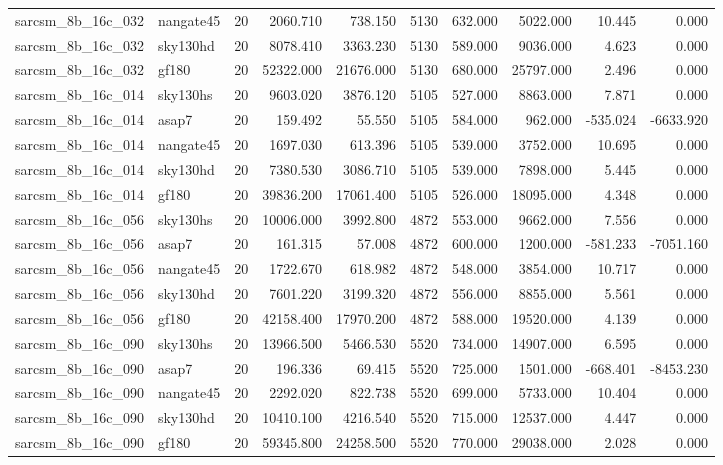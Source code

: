 \documentclass{article}
\begin{document}
\begin{longtable}{llrrrrrrrr}
sarcsm\_8b\_16c\_032 & nangate45 & 20 & 2060.710 & 738.150 & 5130 & 632.000 & 5022.000 & 10.445 & 0.000 \\
sarcsm\_8b\_16c\_032 & sky130hd & 20 & 8078.410 & 3363.230 & 5130 & 589.000 & 9036.000 & 4.623 & 0.000 \\
sarcsm\_8b\_16c\_032 & gf180 & 20 & 52322.000 & 21676.000 & 5130 & 680.000 & 25797.000 & 2.496 & 0.000 \\
sarcsm\_8b\_16c\_014 & sky130hs & 20 & 9603.020 & 3876.120 & 5105 & 527.000 & 8863.000 & 7.871 & 0.000 \\
sarcsm\_8b\_16c\_014 & asap7 & 20 & 159.492 & 55.550 & 5105 & 584.000 & 962.000 & -535.024 & -6633.920 \\
sarcsm\_8b\_16c\_014 & nangate45 & 20 & 1697.030 & 613.396 & 5105 & 539.000 & 3752.000 & 10.695 & 0.000 \\
sarcsm\_8b\_16c\_014 & sky130hd & 20 & 7380.530 & 3086.710 & 5105 & 539.000 & 7898.000 & 5.445 & 0.000 \\
sarcsm\_8b\_16c\_014 & gf180 & 20 & 39836.200 & 17061.400 & 5105 & 526.000 & 18095.000 & 4.348 & 0.000 \\
sarcsm\_8b\_16c\_056 & sky130hs & 20 & 10006.000 & 3992.800 & 4872 & 553.000 & 9662.000 & 7.556 & 0.000 \\
sarcsm\_8b\_16c\_056 & asap7 & 20 & 161.315 & 57.008 & 4872 & 600.000 & 1200.000 & -581.233 & -7051.160 \\
sarcsm\_8b\_16c\_056 & nangate45 & 20 & 1722.670 & 618.982 & 4872 & 548.000 & 3854.000 & 10.717 & 0.000 \\
sarcsm\_8b\_16c\_056 & sky130hd & 20 & 7601.220 & 3199.320 & 4872 & 556.000 & 8855.000 & 5.561 & 0.000 \\
sarcsm\_8b\_16c\_056 & gf180 & 20 & 42158.400 & 17970.200 & 4872 & 588.000 & 19520.000 & 4.139 & 0.000 \\
sarcsm\_8b\_16c\_090 & sky130hs & 20 & 13966.500 & 5466.530 & 5520 & 734.000 & 14907.000 & 6.595 & 0.000 \\
sarcsm\_8b\_16c\_090 & asap7 & 20 & 196.336 & 69.415 & 5520 & 725.000 & 1501.000 & -668.401 & -8453.230 \\
sarcsm\_8b\_16c\_090 & nangate45 & 20 & 2292.020 & 822.738 & 5520 & 699.000 & 5733.000 & 10.404 & 0.000 \\
sarcsm\_8b\_16c\_090 & sky130hd & 20 & 10410.100 & 4216.540 & 5520 & 715.000 & 12537.000 & 4.447 & 0.000 \\
sarcsm\_8b\_16c\_090 & gf180 & 20 & 59345.800 & 24258.500 & 5520 & 770.000 & 29038.000 & 2.028 & 0.000 \\

\end{longtable}
\end{document}
